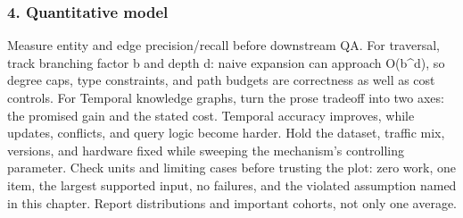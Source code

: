 \subsubsection*{4. Quantitative model}
Measure entity and edge precision/recall before downstream QA. For traversal, track branching factor b and depth d: naive expansion can approach O(b\textasciicircum{}d), so degree caps, type constraints, and path budgets are correctness as well as cost controls.
For Temporal knowledge graphs, turn the prose tradeoff into two axes: the promised gain and the stated cost. Temporal accuracy improves, while updates, conflicts, and query logic become harder. Hold the dataset, traffic mix, versions, and hardware fixed while sweeping the mechanism's controlling parameter.
Check units and limiting cases before trusting the plot: zero work, one item, the largest supported input, no failures, and the violated assumption named in this chapter. Report distributions and important cohorts, not only one average.
